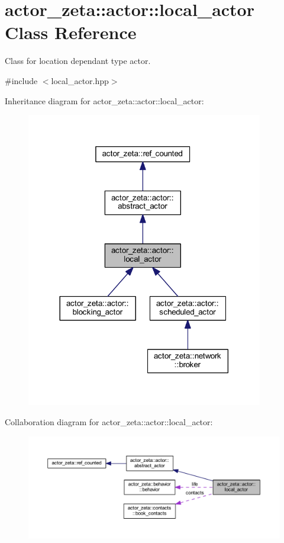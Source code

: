 \hypertarget{classactor__zeta_1_1actor_1_1local__actor}{}\section{actor\+\_\+zeta\+:\+:actor\+:\+:local\+\_\+actor Class Reference}
\label{classactor__zeta_1_1actor_1_1local__actor}


Class for location dependant type actor.  




{\ttfamily \#include $<$local\+\_\+actor.\+hpp$>$}



Inheritance diagram for actor\+\_\+zeta\+:\+:actor\+:\+:local\+\_\+actor\+:\nopagebreak
\begin{figure}[H]
\begin{center}
\leavevmode
\includegraphics[width=293pt]{classactor__zeta_1_1actor_1_1local__actor__inherit__graph}
\end{center}
\end{figure}


Collaboration diagram for actor\+\_\+zeta\+:\+:actor\+:\+:local\+\_\+actor\+:\nopagebreak
\begin{figure}[H]
\begin{center}
\leavevmode
\includegraphics[width=350pt]{classactor__zeta_1_1actor_1_1local__actor__coll__graph}
\end{center}
\end{figure}
